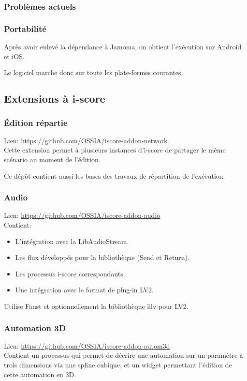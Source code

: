 \documentclass[french,a4paper,openany,12pt]{book}
\begin{document}
\subsubsection{Problèmes actuels}
\subsubsection{Portabilité}
Après avoir enlevé la dépendance à Jamoma, on obtient l'exécution sur Android et iOS.

Le logiciel marche donc sur toute les plate-formes courantes.
    
\subsection{Extensions à i-score}
\subsubsection{Édition répartie}
Lien: \url{https://github.com/OSSIA/iscore-addon-network}~\\
Cette extension permet à plusieurs instances d'i-score de partager le même scénario au moment de l'édition.

Ce dépôt contient aussi les bases des travaux de répartition de l'exécution.

\subsubsection{Audio}
Lien: \url{https://github.com/OSSIA/iscore-addon-audio}~\\

Contient: 
\begin{itemize}
    \item L'intégration avec la LibAudioStream.
    \item Les flux développés pour la bibliothèque (Send et Return).
    \item Les processus i-score correspondants.
    \item Une intégration avec le format de plug-in LV2.
\end{itemize} 

Utilise Faust et optionnellement la bibliothèque lilv pour LV2.

\subsubsection{Automation 3D}
Lien: \url{https://github.com/OSSIA/iscore-addon-autom3d}~\\
Contient un processus qui permet de décrire une automation sur un 
paramètre à trois dimensions via une spline cubique, et un widget 
permettant l'édition de cette automation en 3D.
\end{document}
